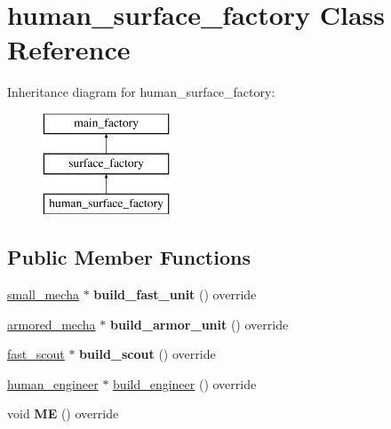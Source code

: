 \hypertarget{classhuman__surface__factory}{}\section{human\+\_\+surface\+\_\+factory Class Reference}
\label{classhuman__surface__factory}
Inheritance diagram for human\+\_\+surface\+\_\+factory\+:\begin{figure}[H]
\begin{center}
\leavevmode
\includegraphics[height=3.000000cm]{classhuman__surface__factory}
\end{center}
\end{figure}
\subsection*{Public Member Functions}
\begin{DoxyCompactItemize}
\item 
\mbox{\label{classhuman__surface__factory_a984dedfbbad2780353803058f58e6de6}} 
\mbox{\hyperlink{classsmall__mecha}{small\+\_\+mecha}} $\ast$ {\bfseries build\+\_\+fast\+\_\+unit} () override
\item 
\mbox{\label{classhuman__surface__factory_a84df519f23b3e9dabd739563d0b4c3a4}} 
\mbox{\hyperlink{classarmored__mecha}{armored\+\_\+mecha}} $\ast$ {\bfseries build\+\_\+armor\+\_\+unit} () override
\item 
\mbox{\label{classhuman__surface__factory_a391c38907f903d5b20d3fd05a88871da}} 
\mbox{\hyperlink{classfast__scout}{fast\+\_\+scout}} $\ast$ {\bfseries build\+\_\+scout} () override
\item 
\mbox{\hyperlink{classhuman__engineer}{human\+\_\+engineer}} $\ast$ \mbox{\hyperlink{classhuman__surface__factory_a9ededd3065e7550d90fe7038daf96564}{build\+\_\+engineer}} () override
\item 
\mbox{\label{classhuman__surface__factory_af0a9fe1cbc284f9ebc80eea70b303c56}} 
void {\bfseries ME} () override
\end{DoxyCompactItemize}
